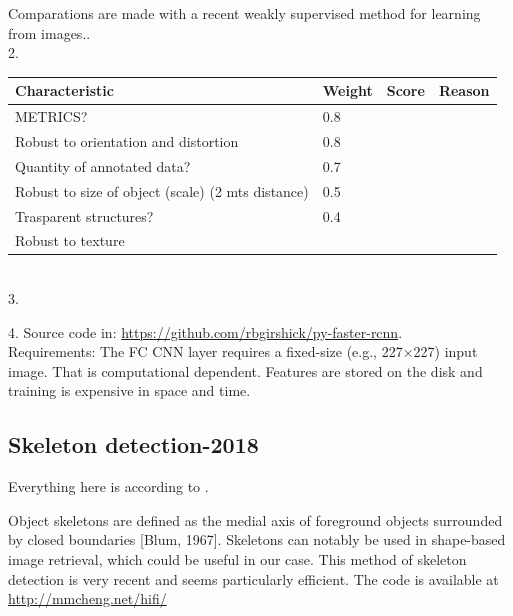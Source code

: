 \documentclass[10pt]{article}
\begin{document}
Comparations are made with a recent weakly supervised method for learning from images..\\

2.
\begin{tabular}{ ||p{3cm}|p{1cm}|p{1cm}|p{8cm}||  }
\hline
Characteristic & Weight & Score & Reason \\
\hline
METRICS?	&0.8 &  &  \\
\hline
Robust to orientation  and distortion	&0.8 &  &  \\
\hline
Quantity of annotated data? &0.7	& & \\
\hline
Robust to size of object (scale) (2 mts distance) &	0.5	& & \\
\hline
Trasparent structures?	&0.4& & \\		
\hline
Robust to texture & & & \\
\end{tabular}\\

3.

4. Source code in: \url{https://github.com/rbgirshick/py-faster-rcnn}.\\
Requirements: The FC CNN layer requires a ﬁxed-size (e.g., 227×227) input image. That is computational dependent. Features are stored on the disk  and training is expensive in space and time. 

\subsection{Skeleton detection-2018}
Everything here is according to \cite{HifiSkeleton}.

Object skeletons are defined as the medial axis of foreground objects surrounded by closed boundaries [Blum, 1967]. Skeletons can notably be used in shape-based image retrieval, which could be useful in our case. This method of skeleton detection is very recent and seems particularly efficient. The code is available at \url{http://mmcheng.net/hifi/}
    
\end{document}
